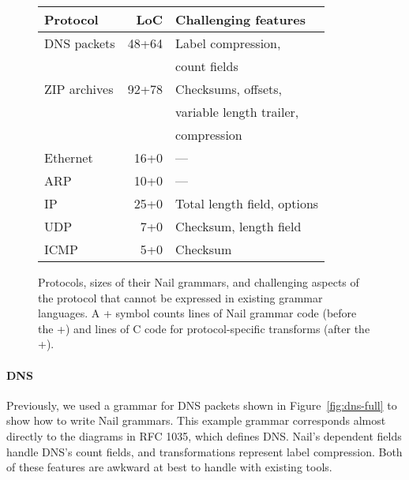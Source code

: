 \begin{figure}[tb]
\smaller[0.5]
\centering
\begin{tabular}{lrl}
\toprule
\textbf{Protocol} & \textbf{LoC} & \textbf{Challenging features} \\ 
\midrule
DNS packets & 48+64 & Label compression,\\
  & & count fields \\
ZIP archives & 92+78 & Checksums, offsets, \\ 
  & & variable length trailer, \\
  & & compression \\
Ethernet  & 16+0\phantom{0} & --- \\
ARP       & 10+0\phantom{0} & --- \\
IP        & 25+0\phantom{0} & Total length field, options \\
UDP       &  7+0\phantom{0} & Checksum, length field \\
ICMP      &  5+0\phantom{0} & Checksum \\
\bottomrule
\end{tabular}

\caption{Protocols, sizes of their Nail grammars, and challenging aspects
of the protocol that cannot be expressed in existing grammar languages.
A + symbol counts lines of Nail grammar code (before the +) and lines of
C code for protocol-specific transforms (after the +).}
\label{fig:eval-protocols}
\end{figure}

\paragraph{DNS} Previously, we used a grammar for DNS packets shown in Figure~\ref{fig:dns-full} to
show how to write Nail grammars.
This example grammar corresponds almost directly to the diagrams in RFC 1035,
which defines DNS\@. Nail's dependent fields handle DNS's count fields, and
transformations represent label compression. Both of these features are awkward at best to handle
with existing tools.


